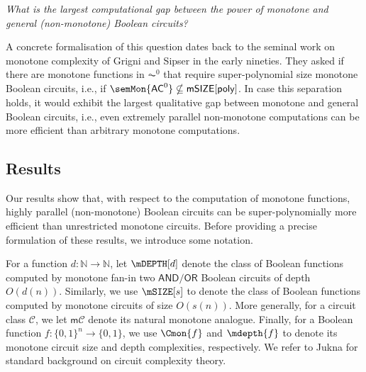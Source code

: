 \documentclass[11pt]{article}
\begin{document}
\begin{center}
    \emph{What is the largest computational gap between the  power of monotone and\\ general \emph{(}non-monotone\emph{)} Boolean circuits?}
\end{center}


A concrete formalisation of this question dates back to the seminal work on monotone complexity of Grigni and Sipser \citep{gs92} in the early nineties. They asked if there are
monotone functions in $\AC^0$ that require super-polynomial size monotone
Boolean circuits, i.e., if $\semMon{\mathsf{AC}^0} \nsubseteq
\mathsf{mSIZE}[\mathsf{poly}]$. In case this separation holds, it would
exhibit the largest qualitative gap between monotone and general
Boolean circuits, i.e., even extremely parallel non-monotone computations
can be more efficient than 
arbitrary
monotone computations.


































\subsection{Results}

Our results show that, with respect to the computation of monotone functions, highly parallel (non-monotone) Boolean circuits can be super-polynomially more efficient than unrestricted monotone circuits. Before providing a precise formulation of these results, we introduce some notation.


For a function $d \colon \mathbb{N} \to \mathbb{N}$, let $\mDEPTH[d]$ denote the class of Boolean functions computed by monotone fan-in two $\mathsf{AND}/\mathsf{OR}$ Boolean circuits of depth $O(d(n))$. Similarly, we use $\mSIZE[s]$ to denote the class of Boolean functions computed by monotone circuits of size $O(s(n))$. More generally, for a circuit class $\mathcal{C}$, we let $\mathsf{m}\mathcal{C}$ denote its natural monotone analogue. Finally, for a Boolean function $f \colon \{0,1\}^n \to \{0,1\}$, we use $\Cmon{f}$ and $\mdepth{f}$ to denote its monotone circuit size and depth complexities, respectively. We refer to Jukna \citep{jukna_2012} for standard background on circuit complexity theory.
\end{document}
